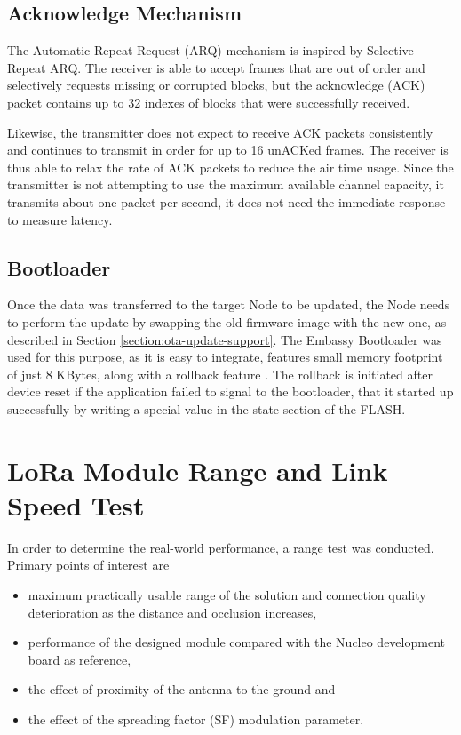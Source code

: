 \subsection{Acknowledge Mechanism}
The Automatic Repeat Request (ARQ) mechanism is inspired by Selective Repeat ARQ. The receiver is able to accept frames that are out of order and selectively requests missing or corrupted blocks, but the acknowledge (ACK) packet contains up to 32 indexes of blocks that were successfully received. 

Likewise, the transmitter does not expect to receive ACK packets consistently and continues to transmit in order for up to 16 unACKed frames. The receiver is thus able to relax the rate of ACK packets to reduce the air time usage. Since the transmitter is not attempting to use the maximum available channel capacity, it transmits about one packet per second, it does not need the immediate response to measure latency.

\subsection{Bootloader}
Once the data was transferred to the target Node to be updated, the Node needs to perform the update by swapping the old firmware image with the new one, as described in Section \ref{section:ota-update-support}. The Embassy Bootloader was used for this purpose, as it is easy to integrate, features small memory footprint of just 8 KBytes, along with a rollback feature \cite{embassy_project_documentation_bootloader_2024}. The rollback is initiated after device reset if the application failed to signal to the bootloader, that it started up successfully by writing a special value in the state section of the FLASH.

\section{\label{section:range-test}LoRa Module Range and Link Speed Test}
In order to determine the real-world performance, a range test was conducted. Primary points of interest are
\begin{itemize}
    \item maximum practically usable range of the solution and connection quality deterioration as the distance and occlusion increases,
    \item performance of the designed module compared with the Nucleo development board as reference,
    \item the effect of proximity of the antenna to the ground and
    \item the effect of the spreading factor (SF) modulation parameter.
\end{itemize}

